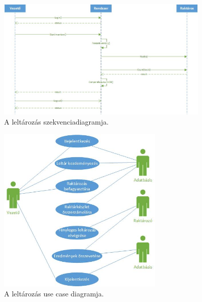 \documentclass[12pt]{article}\usepackage[left=20mm,right=20mm,top=15mm,bottom=20mm]{geometry}
\begin{document}
\begin{figure}[!h]
    \centering
        \includegraphics[width=0.9\textwidth]{figures/leltarazas_SD.jpg}
        \caption{A leltározás szekvenciadiagramja.}
\end{figure}

\begin{figure}[!h]
    \centering
        \includegraphics[width=0.7\textwidth]{figures/leltarazas_UC.jpg}
        \caption{A leltározás use case diagramja.}
\end{figure}

\FloatBarrier
\end{document}
